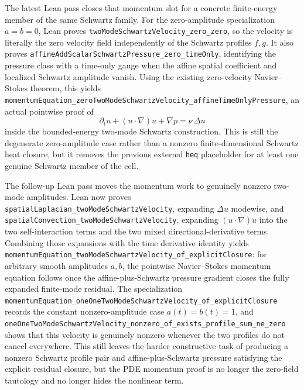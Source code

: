 \documentclass[11pt]{article}
\begin{document}
The latest Lean pass closes that momentum slot for a concrete finite-energy
member of the same Schwartz family.  For the zero-amplitude specialization
\(a=b=0\), Lean proves
\texttt{twoModeSchwartzVelocity\_zero\_zero}, so the velocity is literally the
zero velocity field independently of the Schwartz profiles \(f,g\).  It also
proves \texttt{affineAddScalarSchwartzPressure\_zero\_timeOnly}, identifying
the pressure class with a time-only gauge when the affine spatial coefficient
and localized Schwartz amplitude vanish.  Using the existing zero-velocity
Navier--Stokes theorem, this yields
\texttt{momentumEquation\_zeroTwoModeSchwartzVelocity\_affineTimeOnlyPressure},
an actual pointwise proof of
\[
  \partial_t u + (u\cdot\nabla)u + \nabla p = \nu\,\Delta u
\]
inside the bounded-energy two-mode Schwartz construction.  This is still the
degenerate zero-amplitude case rather than a nonzero finite-dimensional
Schwartz heat closure, but it removes the previous external \texttt{heq}
placeholder for at least one genuine Schwartz member of the cell.

The follow-up Lean pass moves the momentum work to genuinely nonzero two-mode
amplitudes.  Lean now proves
\texttt{spatialLaplacian\_twoModeSchwartzVelocity}, expanding \(\Delta u\)
modewise, and \texttt{spatialConvection\_twoModeSchwartzVelocity}, expanding
\((u\cdot\nabla)u\) into the two self-interaction terms and the two mixed
directional-derivative terms.  Combining those expansions with the time
derivative identity yields
\texttt{momentumEquation\_twoModeSchwartzVelocity\_of\_explicitClosure}: for
arbitrary smooth amplitudes \(a,b\), the pointwise Navier--Stokes momentum
equation follows once the affine-plus-Schwartz pressure gradient closes the
fully expanded finite-mode residual.  The specialization
\texttt{momentumEquation\_oneOneTwoModeSchwartzVelocity\_of\_explicitClosure}
records the constant nonzero-amplitude case \(a(t)=b(t)=1\), and
\texttt{oneOneTwoModeSchwartzVelocity\_nonzero\_of\_exists\_profile\_sum\_ne\_zero}
shows that this velocity is genuinely nonzero whenever the two profiles do not
cancel everywhere.  This still leaves the harder constructive task of producing
a nonzero Schwartz profile pair and affine-plus-Schwartz pressure satisfying
the explicit residual closure, but the PDE momentum proof is no longer the
zero-field tautology and no longer hides the nonlinear term.
\end{document}
